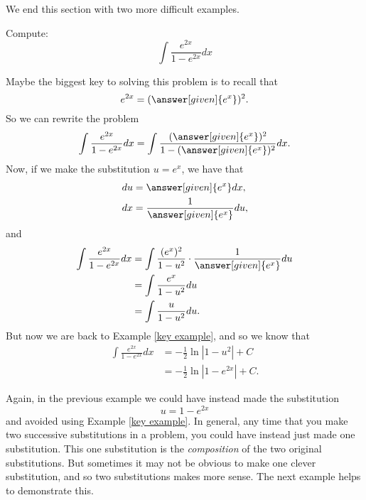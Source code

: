 \documentclass{ximera}
\begin{document}
We end this section with two more difficult examples.



\begin{example}
Compute:
\[
\int \frac{e^{2x}}{1 - e^{2x}} dx
\]
\begin{explanation}
Maybe the biggest key to solving this problem is to recall that
\[
e^{2x} = (\answer[given]{e^x})^2.
\]
So we can rewrite the problem
\[
\int \frac{e^{2x}}{1 - e^{2x}} dx = \int \frac{(\answer[given]{e^x})^2}{1 - (\answer[given]{e^x})^2} dx.
\]
Now, if we make the substitution $u = e^x$, we have that
\begin{align*}
du &= \answer[given]{e^x} dx,\\
dx &= \frac{1}{\answer[given]{e^x}} du,
\end{align*}
and
\begin{align*}
\int \frac{e^{2x}}{1 - e^{2x}} dx &= \int \frac{(e^x)^2}{1 - u^2} \cdot \frac{1}{\answer[given]{e^x}} du  \\
&= \int \frac{e^x}{1-u^2} du  \\
&= \int \frac{u}{1-u^2} du.
\end{align*}
But now we are back to Example \ref{key example}, and so we know that
\begin{align*}
\int \frac{e^{2x}}{1 - e^{2x}} dx &= - \frac{1}{2} \ln|1-u^2| + C  \\
&= - \frac{1}{2} \ln|1 - e^{2x}| + C.
\end{align*}
\end{explanation}
\end{example}


Again, in the previous example we could have instead made the substitution 
\[
u = 1 - e^{2x}
\]
and avoided using Example \ref{key example}.  
In general, any time that you make two successive substitutions in a problem, you could have instead just made one substitution.  
This one substitution is the \textit{composition} of the two original substitutions.  
But sometimes it may not be obvious to make one clever substitution, and so two substitutions makes more sense.  
The next example helps to demonstrate this.
\end{document}
